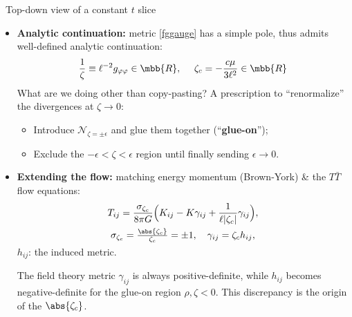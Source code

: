 \documentclass[10pt]{article}
\newcommand{\TTbar}{\texorpdfstring{\ensuremath{T\bar{T}}}{TTbar}\xspace}
\begin{document}
\begin{multicols}{3}
{\begin{center}
	\vspace{-.5\baselineskip}
	\scriptsize\ Top-down view of a constant $t$ slice
\end{center}
}

\begin{itemize}

\item \textbf{Analytic continuation:} metric \eqref{fggauge} has a simple pole, thus admits well-defined analytic continuation:
\begin{equation}
	\frac{1}{\zeta} \equiv \ell^{-2} g_{\varphi\varphi} \in \mbb{R},
\ \quad
	\zeta_c = - \frac{c \mu}{3\ell^2} \in \mbb{R}
\end{equation}
What are we doing other than copy-pasting?
A prescription to ``renormalize'' the divergences at $\zeta \to 0$:
	\begin{itemize}[noitemsep]\small
	\item Introduce $\mathcal N_{\zeta={\pm\epsilon}}$ and glue them together (``\textbf{glue-on}'');
	\item Exclude the $-\epsilon < \zeta < \epsilon$ region until finally sending $\epsilon \to 0$. 
	\end{itemize}
	
\item \textbf{Extending the flow:} matching energy momentum (Brown-York) \& the \TTbar flow equations:
	\begin{equation}
	\begin{gathered}
		T_{ij}= \frac{\sigma_{\zeta_c}}{8\pi G} \Big( K_{ij} -  K \gamma_{ij} + \frac{1}{\ell |\zeta_c|}\gamma_{ij}\Big), \\ \sigma_{\zeta_c} = \tfrac{\abs{\zeta_c}}{\zeta_c} = \pm 1,\quad
		\gamma_{ij} = \zeta_c h_{ij}, \\[-1ex]
	\end{gathered}	\label{BYtensor}
	\end{equation}
	$h_{ij}$: the induced metric. 
	
	The field theory metric $\gamma_{ij}$ is always positive-definite, while $h_{ij}$ becomes negative-definite for the glue-on region $\rho,\zeta < 0$.
	This discrepancy is the origin of the $\abs{\zeta_c}$.


\end{itemize}
\end{multicols}
\end{document}
